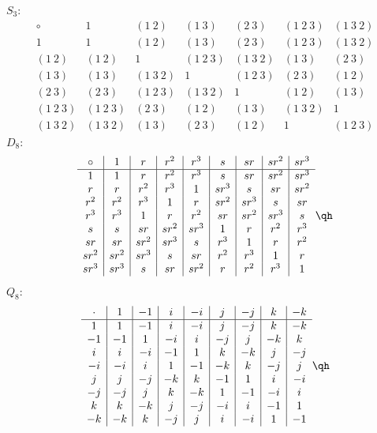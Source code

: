 \begin{sol}
    \leavevmode

    \noindent $S_3$:
    \[\begin{array}{c|c|c|c|c|c|c}
        \circ & 1 & (1\ 2) & (1\ 3) & (2\ 3) & (1\ 2\ 3) & (1\ 3\ 2) \\
        \hline
        1 & 1 & (1\ 2) & (1\ 3) & (2\ 3) & (1\ 2\ 3) & (1\ 3\ 2) \\
        (1\ 2) & (1\ 2) & 1 & (1\ 2\ 3) & (1\ 3\ 2) & (1\ 3) & (2\ 3) \\
        (1\ 3) & (1\ 3) & (1\ 3\ 2) & 1 & (1\ 2\ 3) & (2\ 3) & (1\ 2) \\
        (2\ 3) & (2\ 3) & (1\ 2\ 3) & (1\ 3\ 2) & 1 & (1\ 2) & (1\ 3) \\ 
        (1\ 2\ 3) & (1\ 2\ 3) & (2\ 3) & (1\ 2) & (1\ 3) & (1\ 3\ 2) & 1 \\
        (1\ 3\ 2) & (1\ 3\ 2) & (1\ 3) & (2\ 3) & (1\ 2) & 1 & (1\ 2\ 3)
    \end{array}\]
    $D_8$:
    \[\begin{array}{c|c|c|c|c|c|c|c|c}
        \circ & 1 & r & r^2 & r^3 & s & sr & sr^2 & sr^3 \\
        \hline
        1 & 1 & r & r^2 & r^3 & s & sr & sr^2 & sr^3 \\
        r & r & r^2 & r^3 & 1 & sr^3 & s & sr & sr^2 \\
        r^2 & r^2 & r^3 & 1 & r & sr^2 & sr^3 & s & sr \\
        r^3 & r^3 & 1 & r & r^2 & sr & sr^2 & sr^3 & s \\
        s & s & sr & sr^2 & sr^3 & 1 & r & r^2 & r^3 \\
        sr & sr & sr^2 & sr^3 & s & r^3 & 1 & r & r^2 \\
        sr^2 & sr^2 & sr^3 & s & sr & r^2 & r^3 & 1 & r \\
        sr^3 & sr^3 & s & sr & sr^2 & r & r^2 & r^3 & 1
    \end{array} \qh\]
    $Q_8$:
    \[\begin{array}{c|c|c|c|c|c|c|c|c}
        \cdot & 1 & -1 & i & -i & j & -j & k & -k \\
        \hline
        1 & 1 & -1 & i & -i & j & -j & k & -k \\
        -1 & -1 & 1 & -i & i & -j & j & -k & k \\
        i & i & -i & -1 & 1 & k & -k & j & -j \\
        -i & -i & i & 1 & -1 & -k & k & -j & j \\
        j & j & -j & -k & k & -1 & 1 & i & -i \\
        -j & -j & j & k & -k & 1 & -1 & -i & i \\
        k & k & -k & j & -j & -i & i & -1 & 1 \\
        -k & -k & k & -j & j & i & -i & 1 & -1
    \end{array} \qh\]
\end{sol}


